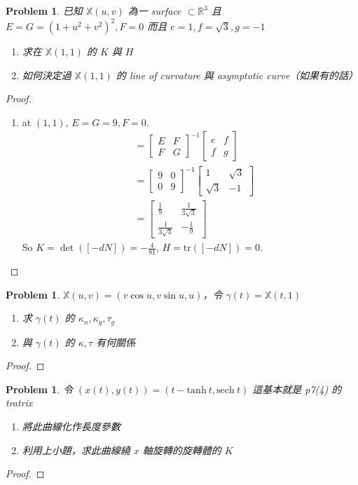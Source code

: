 \documentclass[10pt,a4paper]{article}
\newcounter{theProblemCounter}
\newtheorem{problem}[theProblemCounter]{Problem}
\begin{document}
\setcounter{theProblemCounter}{3}
\begin{problem}
已知 $\mathbb{X}(u, v)$ 為一 surface $\subset \mathbb{R}^3$ 且 $E=G=(1+u^2+v^2)^2, F=0$ 而且 $e=1, f=\sqrt{3}, g=-1$
\begin{enumerate}[{ (}a{)}]
\item 求在 $\mathbb{X}(1, 1)$ 的 $K$ 與 $H$
\item 如何決定過 $\mathbb{X}(1, 1)$ 的 line of curvature 與 asymptotic curve（如果有的話）
\end{enumerate}
\end{problem}
\begin{proof}
\begin{enumerate}[{ (}a{)}]
\item
at $(1,1)$, $E=G=9, F=0$.\\
\begin{align*}
[-dN]&=\begin{bmatrix}E&F\\F&G\end{bmatrix}^{-1}\begin{bmatrix}e&f\\f&g\end{bmatrix}\\
&=\begin{bmatrix}9&0\\0&9\end{bmatrix}^{-1}\begin{bmatrix}1&\sqrt{3}\\\sqrt{3}&-1\end{bmatrix}\\
&=\begin{bmatrix}\frac{1}{9}&\frac{1}{3\sqrt{3}}\\\frac{1}{3\sqrt{3}}&-\frac{1}{9}\end{bmatrix}
\end{align*}
So $K=\det([-dN])=-\frac{4}{81}$, $H=\textrm{tr}([-dN])=0$.
\end{enumerate}
\end{proof}

\setcounter{theProblemCounter}{4}
\begin{problem}
$\mathbb{X}(u, v) = (v\cos u, v\sin u, u)$，令 $\gamma(t)=\mathbb{X}(t, 1)$
\begin{enumerate}[{ (}a{)}]
\item 求 $\gamma(t)$ 的 $\kappa_n, \kappa_g, \tau_g$
\item 與 $\gamma(t)$ 的 $\kappa, \tau$ 有何關係
\end{enumerate}
\end{problem}
\begin{proof}
\end{proof}

\setcounter{theProblemCounter}{5}
\begin{problem}
令 $(x(t), y(t)) = (t-\mathrm{tanh\ } t, \mathrm{sech\ } t)$ 這基本就是 p7(4) 的 tratrix
\begin{enumerate}[{ (}a{)}]
\item 將此曲線化作長度參數
\item 利用上小題，求此曲線繞 $x$ 軸旋轉的旋轉體的 $K$
\end{enumerate}
\end{problem}

\begin{proof}
\end{proof}
\end{document}

